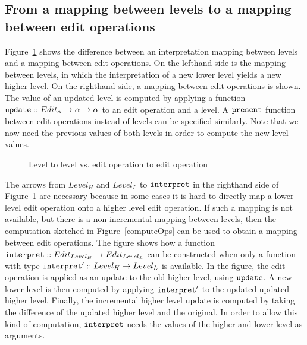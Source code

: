 %																
\subsection{From a mapping between levels to a mapping between edit operations}

Figure~\ref{fromLevelToOp} shows the difference between an interpretation mapping between levels and a mapping between edit operations. On the lefthand side is the mapping between levels, in which the interpretation of a new lower level yields a new higher level. On the righthand side, a mapping between edit operations is shown. The value of an updated level is computed by applying a function
 ${\tt update} :: Edit_\alpha \rightarrow \alpha \rightarrow \alpha$ to an edit operation and a level. A 
 ${\tt present}$ function between edit operations instead of levels can be specified similarly.  Note that we now need the previous values of both levels in order to compute the new level values.
 

\begin{figure}\begin{small}\begin{center}\begin{center}
\end{center}
\caption{Level to level vs. edit operation to edit operation }\label{fromLevelToOp} 
\end{center}\end{small}\end{figure}


The arrows from ${Level_{H}}$ and ${Level_{L}}$ to ${\tt interpret}$ in the righthand side of Figure~\ref{fromLevelToOp} are necessary because in some cases it is hard to directly map a lower level edit operation onto a higher level edit operation.  If such a mapping is not available, but there is a non-incremental mapping between levels, then the computation sketched in Figure~\ref{computeOps} can be used to obtain a mapping between edit operations. The figure shows how a function 
${\tt interpret} :: Edit_{Level_{H}} \rightarrow Edit_{Level_{L}}$ can be constructed when only a function with type ${\tt interpret'} :: Level_{H} \rightarrow Level_{L}$  is available. In the figure, the edit operation is applied as an update to the old higher level, using ${\tt update}$. A new lower level is then computed by applying ${\tt interpret'}$ to the updated updated higher level. Finally, the incremental higher level update is computed by taking the difference of the updated higher level and the original. In order to allow this kind of computation, ${\tt interpret}$ needs the values of the higher and lower level as arguments.

